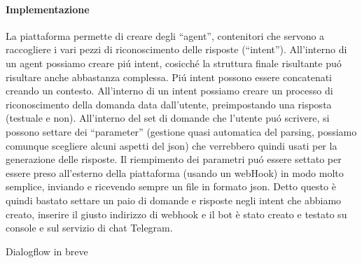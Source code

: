 \documentclass[]{article}
\begin{document}
\paragraph{Implementazione}
La piattaforma permette di creare degli “agent”, contenitori che servono a raccogliere i vari pezzi di riconoscimento delle risposte (“intent”). All’interno di un agent possiamo creare piú intent, cosicché  la struttura finale risultante puó risultare anche abbastanza complessa. Piú intent possono essere concatenati creando un contesto. All’interno di un intent possiamo creare un processo di riconoscimento della domanda data dall’utente, preimpostando una risposta (testuale e non). All’interno del set di domande che l’utente puó scrivere, si possono settare dei “parameter” (gestione quasi automatica del parsing, possiamo comunque scegliere alcuni aspetti del json) che verrebbero quindi usati per la generazione delle risposte. Il riempimento dei parametri puó essere settato per essere preso all’esterno della piattaforma (usando un webHook) in modo molto semplice, inviando e ricevendo sempre un file in formato json. Detto questo è quindi bastato settare un paio di domande e risposte negli intent che abbiamo creato, inserire il giusto indirizzo di webhook e il bot è stato creato e testato su console e sul servizio di chat Telegram.

\begin{center}
\footnotesize{Dialogflow in breve}
\end{center}
\end{document}
